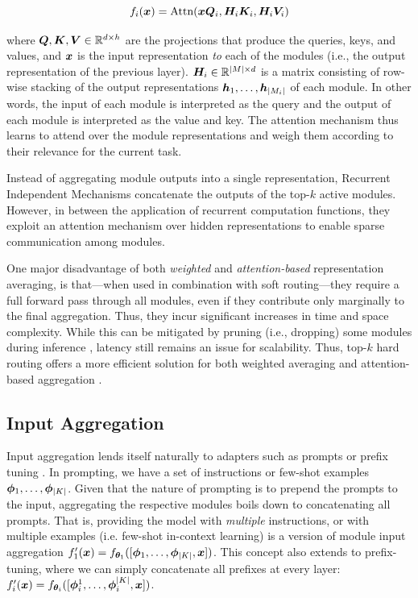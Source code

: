 \documentclass[10pt]{article} %
\begin{document}
\begin{equation}
    f_i({\bm{x}}) = \text{Attn}({\bm{x}} {\bm{Q}}_i, {\bm{H}}_i {\bm{K}}_i, {\bm{H}}_i {\bm{V}}_i)
\end{equation} 

where ${\bm{Q}}, {\bm{K}}, {\bm{V}} \in \mathbb{R}^{d \times h}$ are the projections that produce the queries, keys, and values, and ${\bm{x}}$ is the input representation \textit{to} each of the modules (i.e., the output representation of the previous layer). ${\bm{H}}_i \in \mathbb{R}^{|M| \times d}$ is a matrix consisting of row-wise stacking of the output representations ${\bm{h}}_1, \dots, {\bm{h}}_{|M_i|}$ of each module. In other words, the input of each module is interpreted as the query and the output of each module is interpreted as the value and key. The attention mechanism thus learns to  attend over the module representations and weigh them according to their relevance for the current task.

Instead of aggregating module outputs into a single representation, Recurrent Independent Mechanisms \citep{goyal2019recurrent} concatenate the outputs of the top-$k$ active modules. However, in between the application of recurrent computation functions, they exploit an attention mechanism over hidden representations to enable sparse communication among modules.

One major disadvantage of both \textit{weighted} and \textit{attention-based} representation averaging, is that---when used in combination with soft routing---they require a full forward pass through all modules, even if they contribute only marginally to the final aggregation. Thus, they incur significant increases in time and space complexity. While this can be mitigated by pruning (i.e., dropping) some modules during inference \citep{Rueckle2021AdapterDrop}, latency still remains an issue for scalability. Thus, top-$k$ hard routing offers a more efficient solution for both weighted averaging \citep{shazeer2017outrageously,Lepikhin2021GShard} and attention-based aggregation \citep{goyal2019recurrent}.
 

\subsection{Input Aggregation}

Input aggregation lends itself naturally to adapters such as prompts or prefix tuning \citep[see \cref{sec:nature_modularity:input_composition}]{brown2020language,Lester2021prompttuning,Li2020PrefixTuning}. In prompting, we have a set of instructions or few-shot examples $ {\bm{\phi}}_1, \dots , {\bm{\phi}}_{|K|}$. Given that the nature of prompting is to prepend the prompts to the input, aggregating the respective modules boils down to concatenating all prompts. That is, providing the model with \textit{multiple} instructions, or with multiple examples (i.e. few-shot in-context learning) is a version of module input aggregation $f_1^\prime({\bm{x}}) = f_{{\bm{\theta}}_1}([{\bm{\phi}}_1, \dots, {\bm{\phi}}_{|K|}, {\bm{x}}])$. This concept also extends to prefix-tuning, where we can simply concatenate all prefixes at every layer: $f_i^\prime({\bm{x}}) = f_{{\bm{\theta}}_i}([{\bm{\phi}}_i^1, \dots, {\bm{\phi}}_i^{|K|}, {\bm{x}}])$.
\end{document}
